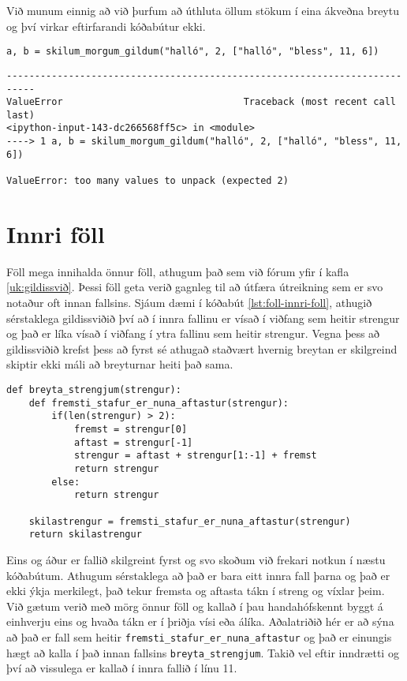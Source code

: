 Við munum einnig að við þurfum að úthluta öllum stökum í eina ákveðna breytu og því virkar eftirfarandi kóðabútur ekki.

\begin{lstlisting}[caption=Fallið úr kóðabút \ref{lst:foll-ndir-skilagildi} notað og skilagildunum úthlutað í breytur rangt, label=lst:foll-skil3]
a, b = skilum_morgum_gildum("halló", 2, ["halló", "bless", 11, 6])
\end{lstlisting}
\lstset{style=uttak}
\begin{lstlisting}
---------------------------------------------------------------------------
ValueError                                Traceback (most recent call last)
<ipython-input-143-dc266568ff5c> in <module>
----> 1 a, b = skilum_morgum_gildum("halló", 2, ["halló", "bless", 11, 6])

ValueError: too many values to unpack (expected 2)
\end{lstlisting}
\lstset{style=venjulegt}

\section{Innri föll}

Föll mega innihalda önnur föll, athugum það sem við fórum yfir í kafla \ref{uk:gildissvið}.
Þessi föll geta verið gagnleg til að útfæra útreikning sem er svo notaður oft innan fallsins.
Sjáum dæmi í kóðabút \ref{lst:foll-innri-foll}, athugið sérstaklega gildissviðið því að í innra fallinu er vísað í viðfang sem heitir strengur og það er líka vísað í viðfang í ytra fallinu sem heitir strengur.
Vegna þess að gildissviðið krefst þess að fyrst sé athugað staðvært hvernig breytan er skilgreind skiptir ekki máli að breyturnar heiti það sama.

\newpage
\begin{lstlisting}[caption=Innri föll kynnt, label=lst:foll-innri-foll]
def breyta_strengjum(strengur):
	def fremsti_stafur_er_nuna_aftastur(strengur):
		if(len(strengur) > 2):
			fremst = strengur[0]
			aftast = strengur[-1]
			strengur = aftast + strengur[1:-1] + fremst
			return strengur
		else:
			return strengur

	skilastrengur = fremsti_stafur_er_nuna_aftastur(strengur)
	return skilastrengur
\end{lstlisting}

Eins og áður er fallið skilgreint fyrst og svo skoðum við frekari notkun í næstu kóðabútum.
Athugum sérstaklega að það er bara eitt innra fall þarna og það er ekki ýkja merkilegt, það tekur fremsta og aftasta tákn í streng og víxlar þeim.
Við gætum verið með mörg önnur föll og kallað í þau handahófskennt byggt á einhverju eins og hvaða tákn er í þriðja vísi eða álíka.
Aðalatriðið hér er að sýna að það er fall sem heitir \texttt{fremsti\_stafur\_er\_nuna\_aftastur} og það er einungis hægt að kalla í það innan fallsins \texttt{breyta\_strengjum}.
Takið vel eftir inndrætti og því að vissulega er kallað í innra fallið í línu 11.

